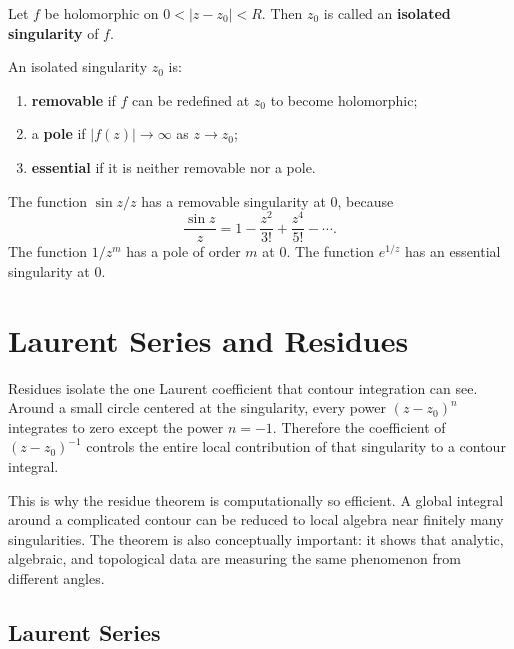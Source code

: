 \begin{definition}
Let $f$ be holomorphic on $0<|z-z_0|<R$. Then $z_0$ is called an \textbf{isolated singularity} of $f$.
\end{definition}

\begin{definition}
An isolated singularity $z_0$ is:
\begin{enumerate}
    \item \textbf{removable} if $f$ can be redefined at $z_0$ to become holomorphic;
    \item a \textbf{pole} if $|f(z)|\to\infty$ as $z\to z_0$;
    \item \textbf{essential} if it is neither removable nor a pole.
\end{enumerate}
\end{definition}

\newpage

\begin{example}
The function $\sin z/z$ has a removable singularity at $0$, because
\[
    \frac{\sin z}{z}=1-\frac{z^2}{3!}+\frac{z^4}{5!}-\cdots.
\]
The function $1/z^m$ has a pole of order $m$ at $0$. The function $e^{1/z}$ has an essential singularity at $0$.
\end{example}

\section{Laurent Series and Residues}


Residues isolate the one Laurent coefficient that contour integration can see. Around a small circle centered at the singularity, every power $(z-z_0)^n$ integrates to zero except the power $n=-1$. Therefore the coefficient of $(z-z_0)^{-1}$ controls the entire local contribution of that singularity to a contour integral.

This is why the residue theorem is computationally so efficient. A global integral around a complicated contour can be reduced to local algebra near finitely many singularities. The theorem is also conceptually important: it shows that analytic, algebraic, and topological data are measuring the same phenomenon from different angles.

\subsection{Laurent Series}

